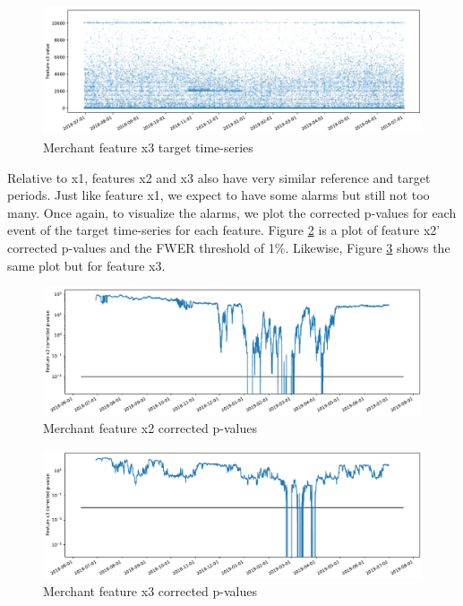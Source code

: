 \begin{figure}[!htb]
    \begin{center}
      \includegraphics[scale=0.5]{figures/merchant-x3-target.pdf}
      \caption{Merchant feature x3 target time-series}
      \label{fig:merchant-x3-target}
    \end{center}
\end{figure}
\clearpage
Relative to x1, features x2 and x3 also have very similar reference and target periods. Just like feature x1, we expect to have some alarms but still not too many. Once again, to visualize the alarms, we plot the corrected p-values for each event of the target time-series for each feature. Figure \ref{fig:merchant-x2-correctedpvalues} is a plot of feature x2' corrected p-values and the FWER threshold of 1\%. Likewise, Figure \ref{fig:merchant-x3-correctedpvalues} shows the same plot but for feature x3.
\begin{figure}[!htb]
    \begin{center}
      \includegraphics[scale=0.5]{figures/merchant-x2-correctedpvalues.pdf}
      \caption{Merchant feature x2 corrected p-values}
      \label{fig:merchant-x2-correctedpvalues}
    \end{center}
\end{figure}
\begin{figure}[!htb]
    \begin{center}
      \includegraphics[scale=0.5]{figures/merchant-x3-correctedpvalues.pdf}
      \caption{Merchant feature x3 corrected p-values}
      \label{fig:merchant-x3-correctedpvalues}
    \end{center}
\end{figure}
